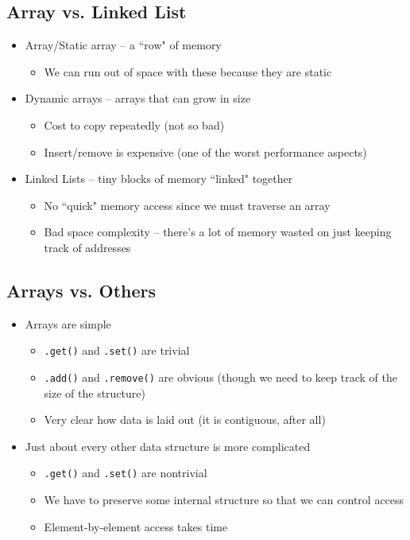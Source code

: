 \documentclass[10pt]{article}
\begin{document}
\subsection*{Array vs. Linked List}
\begin{itemize}
    \item Array/Static array -- a ``row" of memory
    \begin{itemize}
        \item We can run out of space with these because they are static
    \end{itemize}
    \item Dynamic arrays -- arrays that can grow in size
    \begin{itemize}
        \item Cost to copy repeatedly (not so bad)
        \item Insert/remove is expensive (one of the worst performance aspects)
    \end{itemize}
    \item Linked Lists -- tiny blocks of memory ``linked" together
    \begin{itemize}
        \item No ``quick" memory access since we must traverse an array
        \item Bad space complexity -- there's a lot of memory wasted on just keeping track of addresses
    \end{itemize}
\end{itemize}

\subsection*{Arrays vs. Others}
\begin{itemize}
    \item Arrays are simple
    \begin{itemize}
        \item \texttt{.get()} and \texttt{.set()} are trivial
        \item \texttt{.add()} and \texttt{.remove()} are obvious (though we need to keep track of the size of the structure)
        \item Very clear how data is laid out (it is contiguous, after all)
    \end{itemize}
    \item Just about every other data structure is more complicated
    \begin{itemize}
        \item \texttt{.get()} and \texttt{.set()} are nontrivial
        \item We have to preserve some internal structure so that we can control access
        \item Element-by-element access takes time
    \end{itemize}
\end{itemize}
\end{document}
